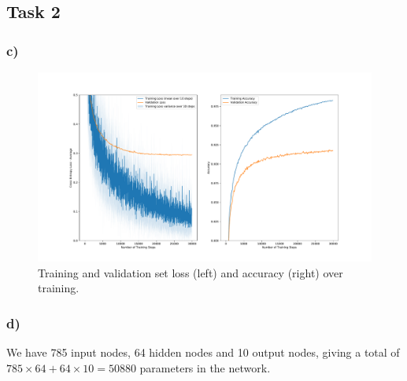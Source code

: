 \subsection*{Task 2}

\subsubsection*{c)}

\begin{figure}[h!]
  \centering
  \includegraphics[clip, trim=3cm 0cm 3cm 0cm ,width=\textwidth]{figures/Task2c.pdf}
  \caption{Training and validation set loss (left) and accuracy (right) over training.}
  \label{fig:task2:loss_accuracy}
\end{figure}


\subsubsection*{d)}

We have 785 input nodes, 64 hidden nodes and 10 output nodes, giving a total of $785 \times 64 + 64 \times 10 = 50880$ parameters in the network.
